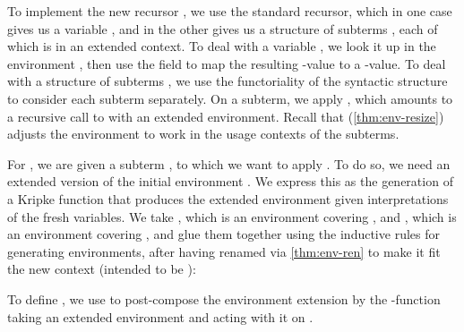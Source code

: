 
To implement the new recursor , we use the standard
recursor, which in one case gives us a variable , and in the other
gives us a structure of subterms , each of which is in an extended
context.
To deal with a variable , we look it
up in the environment \AgdaBound{$\rho$}, then use the
 field to map the resulting
\AgdaBound{$\V$}-value to a \AgdaBound{$\C$}-value.
To deal with a structure of subterms , we use the functoriality of
the syntactic structure to consider each subterm separately.
On a subterm, we apply , which amounts to a recursive call
to  with an extended environment.
Recall that  (\cref{thm:env-resize}) adjusts the
environment \AgdaBound{$\rho$} to work in the usage contexts of the subterms.


For , we are given a subterm , to
which we want to apply .  To do so, we need an
extended version of the initial environment \AgdaBound{$\rho$}. We
express this as the generation of a Kripke function that produces the
extended environment given interpretations of the fresh variables. We
take \AgdaBound{$\rho$}, which is an environment covering
\AgdaBound{$\Delta$}, and \AgdaBound{$\sigma$}, which is an
environment covering \AgdaBound{$\Theta$}, and glue them together
using the inductive rules for generating environments, after having
renamed \AgdaBound{$\rho$} via \cref{thm:env-ren} to make it fit the
new context \AgdaBound{$\Gamma^+$} (intended to be
):


To define , we use  to
post-compose the environment extension by the
\AgdaSymbol{$\lambda$}-function taking an extended environment and
acting with it on .


